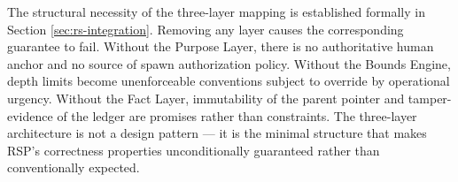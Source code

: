 The structural necessity of the three-layer mapping is established formally in Section \ref{sec:rs-integration}. Removing any layer causes the corresponding guarantee to fail. Without the Purpose Layer, there is no authoritative human anchor and no source of spawn authorization policy. Without the Bounds Engine, depth limits become unenforceable conventions subject to override by operational urgency. Without the Fact Layer, immutability of the parent pointer and tamper-evidence of the ledger are promises rather than constraints. The three-layer architecture is not a design pattern --- it is the minimal structure that makes RSP's correctness properties unconditionally guaranteed rather than conventionally expected.
